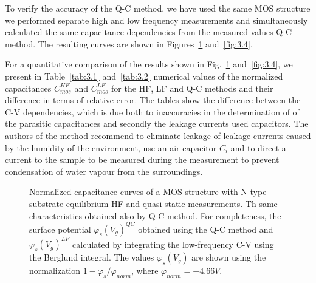 To verify the accuracy of the Q-C method, we have used the same MOS
structure we performed separate high and low frequency measurements
and simultaneously calculated the same capacitance dependencies from
the measured values Q-C method.  The resulting curves are shown in
Figures~\ref{fig:3.3} and~\ref{fig:3.4}.

For a quantitative comparison of the results shown in
Fig.~\ref{fig:3.3} and~\ref{fig:3.4}, we present in
Table~\ref{tab:3.1} and~\ref{tab:3.2} numerical values of the
normalized capacitances $C^{HF}_{mos}$ and $C^{LF}_{mos}$ for the HF,
LF and Q-C methods and their difference in terms of relative
error. The tables show the difference between the C-V dependencies,
which is due both to inaccuracies in the determination of of the
parasitic capacitances and secondly the leakage currents used
capacitors. The authors of the method recommend to eliminate leakage
of leakage currents caused by the humidity of the environment, use an
air capacitor $C_i$ and to direct a current to the sample to be
measured during the measurement to prevent condensation of water
vapour from the surroundings.

\newpage
\begin{figure}[h!]\centering
  
  \caption[Normalized capacitance curves of MOS structure with
    substrate type N for equilibrium HF and quasi-static
    measurements]{Normalized capacitance curves of a MOS structure
    with N-type substrate equilibrium HF and quasi-static
    measurements. Th same characteristics obtained also by Q-C
    method. For completeness, the surface potential
    ${\varphi_s(V_g)}^{QC}$ obtained using the Q-C method and
    ${\varphi_s(V_g)}^{LF}$ calculated by integrating the
    low-frequency C-V using the Berglund integral. The values
    $\varphi_s(V_g)$ are shown using the normalization
    $1-{\varphi_s}/{\varphi_{norm}}$, where
    $\varphi_{norm}=-4.66V$.}\label{fig:3.3}
\end{figure}

